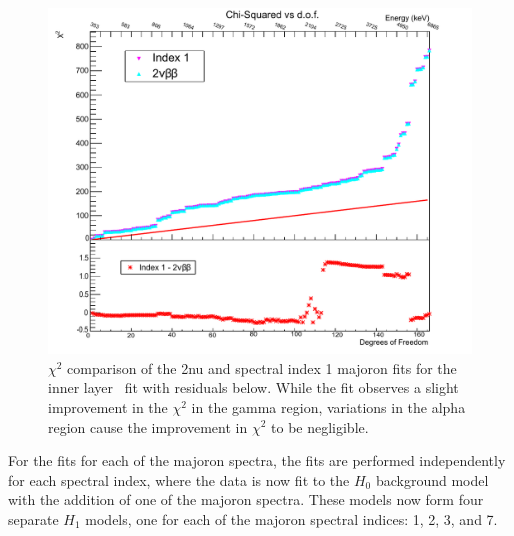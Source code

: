 \begin{figure}
    \centering
    \includegraphics[width=0.8\linewidth]{Figures/Combined_M1L0_chi2_fixed_labels.pdf}
    \caption[$\chi^2$ comparison of the 2nu and spectral index 1 majoron fits]
    {$\chi^2$ comparison of the 2nu and spectral index 1 majoron fits for the inner layer \Mone~fit with residuals below.
    While the fit observes a slight improvement in the $\chi^2$ in the gamma region, variations in the alpha region cause the improvement in $\chi^2$ to be negligible.}
    \label{fig:2nu_n1_combinedM1L0chi2}
\end{figure}

For the fits for each of the majoron spectra, the fits are performed independently for each spectral index, where the data is now fit to the $H_0$ background model with the addition of one of the majoron spectra.
These models now form four separate $H_1$ models, one for each of the majoron spectral indices: 1, 2, 3, and 7.

